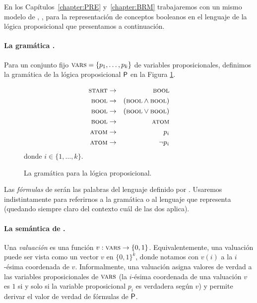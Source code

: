 
En los Capítulos~\ref{chapter:PRE} y~\ref{chapter:BRM} trabajaremos con un mismo modelo de \lot, \grambool, para la representación de conceptos booleanos en el lenguaje de la lógica proposicional que presentamos a continuación.

\paragraph{La gramática \grambool.}
Para un conjunto fijo $\textsc{vars}=\{p_1,\dots,p_k\}$ de variables proposicionales, definimos la gramática de la lógica proposicional ${\sf P}$ en la Figura \ref{fig:grambool}.
%
\renewcommand{\thefigure}{PII.1}
\begin{figure}[h!]
\begin{eqnarray*}
\textsc{start} &\to&\textsc{bool}\\
\textsc{bool} &\to&(\textsc{bool} \wedge \textsc{bool}) \\
\textsc{bool} &\to&(\textsc{bool} \vee \textsc{bool}) \\
\textsc{bool} &\to&\textsc{atom}\\
\textsc{atom} &\to& p_i \\
\textsc{atom} &\to&\lnot p_i 
\end{eqnarray*}
donde $i\in\{1,\dots,k\}$.
\caption{La gramática \grambool para la lógica proposicional.}
\label{fig:grambool}
\end{figure}
%
Las {\em fórmulas} de \grambool serán las palabras del lenguaje definido por \grambool. Usaremos indistintamente \grambool para referirnos a la gramática o al lenguaje que representa (quedando siempre claro del contexto cuál de las dos aplica).


\paragraph{La semántica de \grambool.}
Una {\em valuación} es una función $v:\textsc{vars}\to\{0,1\}$. Equivalentemente, una valuación puede ser vista como un vector $v$ en $\{0,1\}^k$, donde notamos con $v(i)$ a la $i$-ésima coordenada de $v$. Informalmente, una valuación asigna valores de verdad a las variables proposicionales de $\textsc{vars}$ (la $i$-ésima coordenada de una valuación $v$ es $1$ si y solo si la variable proposicional $p_i$ es verdadera según $v$) y permite derivar el valor de verdad de fórmulas de ${\sf P}$.  

